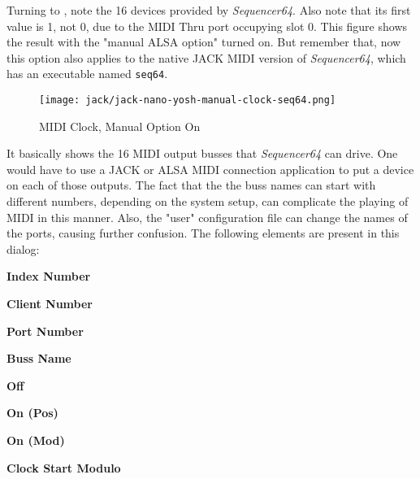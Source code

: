 
   Turning to ,
   note the 16 devices provided by
   \textsl{Sequencer64}.  Also note that its first value is 1, not 0, due to
   the MIDI Thru port occupying slot 0.
   This figure shows the result with the "manual ALSA option" turned on.
   But remember that, now this option also applies to the native JACK MIDI
   version of \textsl{Sequencer64}, which has an executable named
   \texttt{seq64}.

\begin{figure}[H]
   \centering 
   \texttt{[image: jack/jack-nano-yosh-manual-clock-seq64.png]}
   \caption{MIDI Clock, Manual Option On}
   \label{fig:seq64_midi_clock_4_devices_manual_1}
\end{figure}

   It basically shows the 16 MIDI output busses that \textsl{Sequencer64} can
   drive.  One would have to use a JACK or ALSA MIDI connection application to
   put a device on each of those outputs.  The fact that the the buss names can
   start with different numbers, depending on the system setup, can complicate
   the playing of MIDI in this manner.  Also, the "user" configuration file can
   change the names of the ports, causing further confusion.
   The following elements are present in this dialog:

   \begin{enumber}
      \item \textbf{Index Number}
      \item \textbf{Client Number}
      \item \textbf{Port Number}
      \item \textbf{Buss Name}
      \item \textbf{Off}
      \item \textbf{On (Pos)}
      \item \textbf{On (Mod)}
      \item \textbf{Clock Start Modulo}
   \end{enumber}

